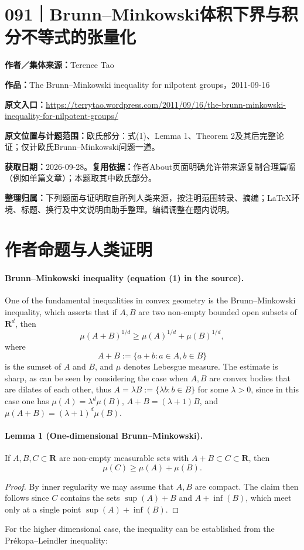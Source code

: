 \documentclass[UTF8,11pt,a4paper]{ctexart}
\theoremstyle{definition}\newtheorem*{definition}{Definition}
\theoremstyle{remark}\newtheorem*{remark}{Remark}
\begin{document}
\section*{091｜Brunn--Minkowski体积下界与积分不等式的张量化}
\textbf{作者／集体来源：}Terence Tao

\textbf{作品：}The Brunn--Minkowski inequality for nilpotent groups，2011-09-16

\textbf{原文入口：}\url{https://terrytao.wordpress.com/2011/09/16/the-brunn-minkowski-inequality-for-nilpotent-groups/}

\textbf{原文位置与计题范围：}欧氏部分：式(1)、Lemma 1、Theorem 2及其后完整论证；仅计欧氏Brunn--Minkowski问题一道。

\textbf{获取日期：}2026-09-28。\quad\textbf{复用依据：}作者About页面明确允许带来源复制合理篇幅（例如单篇文章）；本题取其中欧氏部分。

\textbf{整理归属：}下列题面与证明取自所列人类来源，按注明范围转录、摘编；LaTeX环境、标题、换行及中文说明由助手整理。编辑调整在题内说明。

\section*{作者命题与人类证明}

\paragraph{Brunn--Minkowski inequality (equation (1) in the source).}
One of the fundamental inequalities in convex geometry is the Brunn--Minkowski inequality, which asserts that if $A,B$ are two non-empty bounded open subsets of $\mathbf R^d$, then
\begin{equation}
\mu(A+B)^{1/d}\geq\mu(A)^{1/d}+\mu(B)^{1/d},\tag{1}
\end{equation}
where
\[
A+B:=\{a+b:a\in A,b\in B\}
\]
is the sumset of $A$ and $B$, and $\mu$ denotes Lebesgue measure. The estimate is sharp, as can be seen by considering the case when $A,B$ are convex bodies that are dilates of each other, thus $A=\lambda B:=\{\lambda b:b\in B\}$ for some $\lambda>0$, since in this case one has $\mu(A)=\lambda^d\mu(B)$, $A+B=(\lambda+1)B$, and $\mu(A+B)=(\lambda+1)^d\mu(B)$.

\paragraph{Lemma 1 (One-dimensional Brunn--Minkowski).}
If $A,B,C\subset\mathbf R$ are non-empty measurable sets with $A+B\subset C\subset\mathbf R$, then
\[\mu(C)\geq\mu(A)+\mu(B).\]
\begin{proof}
By inner regularity we may assume that $A,B$ are compact. The claim then follows since $C$ contains the sets $\sup(A)+B$ and $A+\inf(B)$, which meet only at a single point $\sup(A)+\inf(B)$.
\end{proof}
For the higher dimensional case, the inequality can be established from the Pr\'ekopa--Leindler inequality:
\end{document}
